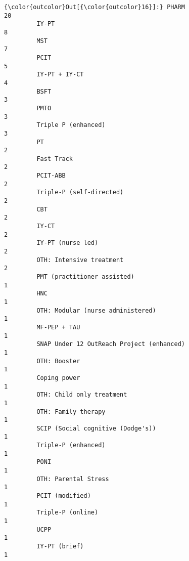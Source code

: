 \documentclass{article}
\begin{document}
            \begin{Verbatim}[commandchars=\\\{\}]
{\color{outcolor}Out[{\color{outcolor}16}]:} PHARM                                                           20
         IY-PT                                                            8
         MST                                                              7
         PCIT                                                             5
         IY-PT + IY-CT                                                    4
         BSFT                                                             3
         PMTO                                                             3
         Triple P (enhanced)                                              3
         PT                                                               2
         Fast Track                                                       2
         PCIT-ABB                                                         2
         Triple-P (self-directed)                                         2
         CBT                                                              2
         IY-CT                                                            2
         IY-PT (nurse led)                                                2
         OTH: Intensive treatment                                         2
         PMT (practitioner assisted)                                      1
         HNC                                                              1
         OTH: Modular (nurse administered)                                1
         MF-PEP + TAU                                                     1
         SNAP Under 12 OutReach Project (enhanced)                        1
         OTH: Booster                                                     1
         Coping power                                                     1
         OTH: Child only treatment                                        1
         OTH: Family therapy                                              1
         SCIP (Social cognitive (Dodge's))                                1
         Triple-P (enhanced)                                              1
         PONI                                                             1
         OTH: Parental Stress                                             1
         PCIT (modified)                                                  1
         Triple-P (online)                                                1
         UCPP                                                             1
         IY-PT (brief)                                                    1

\end{Verbatim}
\end{document}
